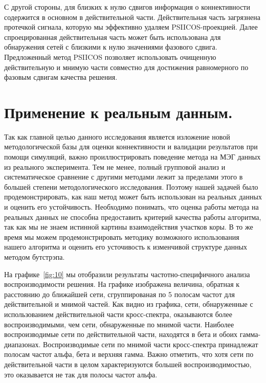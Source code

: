 С другой стороны, для близких к нулю сдвигов информация о коннективности содержится
в основном в действительной части. Действительная часть загрязнена протечкой сигнала, которую
мы эффективно удаляем PSIICOS-проекцией. Далее спроецированная действительная часть
может быть использована для обнаружения сетей с близкими к нулю значениями фазового
сдвига. Предложенный метод PSIICOS позволяет использовать очищенную действительную
и мнимую части совместно для достижения равномерного по фазовым сдвигам качества решения.

\section{Применение к реальным данным.} Так как главной целью данного
исследования является изложение новой методологической базы для оценки
коннективности и валидации результатов при помощи симуляций, важно
проиллюстрировать поведение метода на МЭГ данных из реального эксперимента.
Тем не менее, полный групповой анализ и систематическое сравнение с другими
методами лежит за пределами этого в большей степени методологического исследования.
Поэтому нашей задачей было продемонстрировать, как наш метод может быть использован на
реальных данных и оценить его устойчивость.
Необходимо понимать, что оценка работы метода на
реальных данных не способна предоставить критерий качества работы алгоритма, так как
мы не знаем истинной картины взаимодействия участков коры. В то же время мы можем
продемонстрировать методику возможного использования нашего алгоритма и оценить
его усточивость к изменчивой структуре данных методом бутстрэпа.

На графике~\ref{fig:10} мы отобразили результаты частотно-специфичного
анализа воспроизводимости решения. На графике изображена величина, обратная к
расстоянию до ближайшей сети, сгруппированая по 5 полосам частот для
действительной и мнимой частей. Как видно из графика, сети, обнаруженные с
использованием действительной части кросс-спектра, оказываются более
воспроизводимыми, чем сети, обнаруженные по мнимой части. Наиболее воспроизводимые
сети по действительной части, находятся в бета и обоих гамма-диапазонах.
Воспроизводимые сети по мнимой части кросс-спектра принадлежат полосам частот
альфа, бета и верхняя гамма. Важно отметить, что хотя сети по действительной части
в целом характеризуются большей воспроизводимостью, это оказывается не так для
полосы частот альфа.


